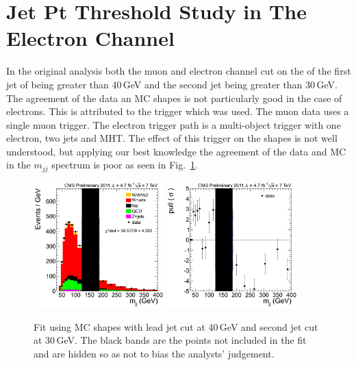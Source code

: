 \section{Jet Pt Threshold Study in The Electron Channel}
\label{sec:ElectronJetStudy}

In the original analysis both the muon and electron channel cut on the
\pt of the first jet of being greater than 40\,GeV and the second jet
being greater than 30\,GeV.  The agreement of the data an MC shapes is
not particularly good in the case of electrons.  This is attributed to
the trigger which was used.  The muon data uses a single muon trigger.
The electron trigger path is a multi-object trigger with one electron,
two jets and MHT.  The effect of this trigger on the shapes is not
well understood, but applying our best knowledge the agreement of the
data and MC in the $m_{jj}$ spectrum is poor as seen in
Fig.~\ref{fig:Electron4030}.

\begin{figure}
\begin{center}
  \includegraphics[width=0.45\textwidth]{figs/ElectronCuts/hist30_Wjj_Mjj_Electron_2jets_Stacked.png}
  \includegraphics[width=0.45\textwidth]{figs/ElectronCuts/hist30_Wjj_Mjj_Electron_2jets_Pull.png}
\end{center}
\caption{\label{fig:Electron4030}Fit using MC shapes with lead jet cut at 40\,GeV and second jet cut at 30\,GeV.  The black bands are the points not included in the fit and are hidden so as not to bias the analysts' judgement.}
\end {figure}

